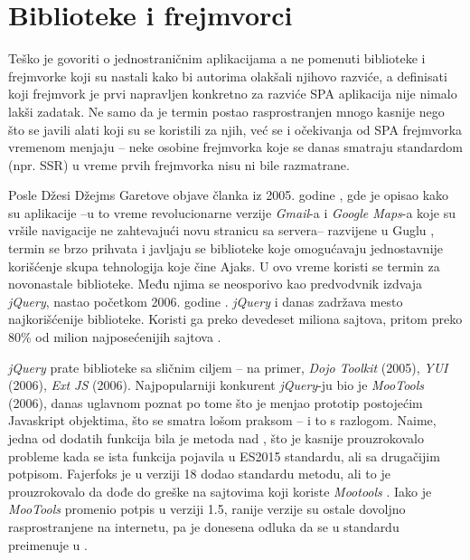 \section{Biblioteke i frejmvorci}

Teško je govoriti o jednostraničnim aplikacijama a ne pomenuti biblioteke i frejmvorke koji su nastali kako bi autorima olakšali njihovo razviće, a definisati koji frejmvork je prvi napravljen konkretno za razviće SPA aplikacija nije nimalo lakši zadatak.
Ne samo da je termin  postao rasprostranjen mnogo kasnije nego što se javili alati koji su se koristili za njih, već se i očekivanja od SPA frejmvorka vremenom menjaju -- neke osobine frejmvorka koje se danas smatraju standardom (npr. SSR) u vreme prvih frejmvorka nisu ni bile razmatrane.

Posle Džesi Džejms Garetove objave članka iz 2005. godine \cite{ajax-a-new-approach}, gde je opisao kako su aplikacije --u to vreme revolucionarne verzije \textsl{Gmail}-a i \textsl{Google Maps}-a koje su vršile navigacije ne zahtevajući novu stranicu sa servera-- razvijene u Guglu \cite{aaronsw:ajax-history}, termin  se brzo prihvata i javljaju se biblioteke koje omogućavaju jednostavnije korišćenje skupa tehnologija koje čine Ajaks.
U ovo vreme koristi se termin  za novonastale biblioteke.
Među njima se neosporivo kao predvodvnik izdvaja \textsl{jQuery}, nastao početkom 2006. godine \cite{vincent:short-history}.
\textsl{jQuery} i danas zadržava mesto najkorišćenije biblioteke.
Koristi ga preko devedeset miliona sajtova, pritom preko 80\% od milion najposećenijih sajtova \cite{built-with-jquery}.

\textsl{jQuery} prate biblioteke sa sličnim ciljem -- na primer, \textsl{Dojo Toolkit} (2005), \textsl{YUI} (2006), \textsl{Ext JS} (2006).
Najpopularniji konkurent \textsl{jQuery}-ju bio je \textsl{MooTools} (2006), danas uglavnom poznat po tome što je menjao prototip postojećim Javaskript objektima, što se smatra lošom praksom -- i to s razlogom.
Naime, jedna od dodatih funkcija bila je metoda  nad , što je kasnije prouzrokovalo probleme kada se ista funkcija pojavila u ES2015 standardu, ali sa drugačijim potpisom.
Fajerfoks je u verziji 18 dodao standardu metodu, ali to je prouzrokovalo da dođe do greške na sajtovima koji koriste \textsl{Mootools} \cite{mdn:string-includes}.
Iako je \textsl{MooTools} promenio potpis u verziji 1.5, ranije verzije su ostale dovoljno rasprostranjene na internetu, pa je donesena odluka da se  u standardu preimenuje u .

